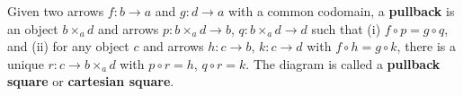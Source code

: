 Given two arrows $f: b \to a$ and $g: d \to a$ with a common codomain, a \textbf{pullback} is an object $b \times_a d$ and arrows $p: b \times_a d \to b$, $q: b \times_a d \to d$ such that (i) $f \circ p = g \circ q$, and (ii) for any object $c$ and arrows $h: c \to b$, $k: c \to d$ with $f \circ h = g \circ k$, there is a unique $r: c \to b \times_a d$ with $p \circ r = h$, $q \circ r = k$. The diagram is called a \textbf{pullback square} or \textbf{cartesian square}.
